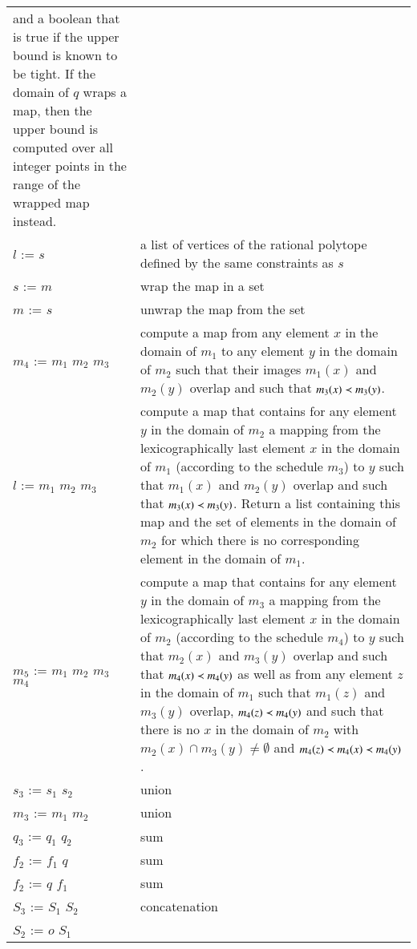 \begin{supertabular}{p{0.35\textwidth}p{0.6\textwidth}}
and a boolean that is true if the upper bound
is known to be tight.
If the domain of $q$ wraps a map, then the upper
bound is computed over all integer points in
the range of the wrapped map instead.
\\
$l$ :=  $s$ &
a list of vertices of the rational polytope defined by the same constraints
as $s$
\\
$s$ :=  $m$ &
wrap the map in a set
\\
$m$ :=  $s$ &
unwrap the map from the set
\\
$m_4$ :=  $m_1$  $m_2$  $m_3$ &
compute a map from any element $x$ in the domain of $m_1$
to any element $y$ in the domain of $m_2$
such that their images $m_1(x)$ and $m_2(y)$ overlap
and such that $m_3(x) \prec m_3(y)$.
\\
$l$ :=  $m_1$  $m_2$  $m_3$ &
compute a map that contains for any element $y$ in the domain of $m_2$
a mapping from the lexicographically last element $x$ in the domain of $m_1$
(according to the schedule $m_3$) to $y$
such that $m_1(x)$ and $m_2(y)$ overlap and such that $m_3(x) \prec m_3(y)$.
Return a list containing this map and the set of elements in the domain of
$m_2$ for which there is no corresponding element in the domain of $m_1$.
\\
$m_5$ :=  $m_1$  $m_2$  $m_3$
 $m_4$ &
compute a map that contains for any element $y$ in the domain of $m_3$
a mapping from the lexicographically last element $x$ in the domain of $m_2$
(according to the schedule $m_4$) to $y$
such that $m_2(x)$ and $m_3(y)$ overlap and such that $m_4(x) \prec m_4(y)$
as well as from any element $z$ in the domain of $m_1$ such that
$m_1(z)$ and $m_3(y)$ overlap, $m_4(z) \prec m_4(y)$ and such that there
is no $x$ in the domain of $m_2$ with
$m_2(x) \cap m_3(y) \ne \emptyset$ and $m_4(z) \prec m_4(x) \prec m_4(y)$.
\\
$s_3$ := $s_1$ \ai{$+$} $s_2$ & union
\\
$m_3$ := $m_1$ \ai{$+$} $m_2$ & union
\\
$q_3$ := $q_1$ \ai{$+$} $q_2$ & sum
\\
$f_2$ := $f_1$ \ai{$+$} $q$ & sum
\\
$f_2$ := $q$ \ai{$+$} $f_1$ & sum
\\
$S_3$ := $S_1$ \ai{$+$} $S_2$ & concatenation
\\
$S_2$ := $o$ \ai{$+$} $S_1$ &

\end{supertabular}
